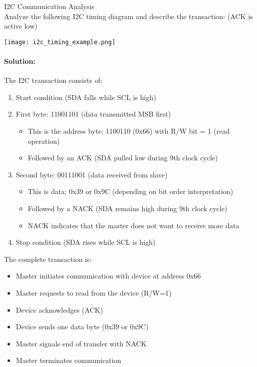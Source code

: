 \begin{example2}{I2C Communication Analysis}\\
Analyze the following I2C timing diagram and describe the transaction: (ACK is active low)

\texttt{[image: i2c\_timing\_example.png]}

\tcblower
\paragraph{Solution:}
The I2C transaction consists of:
\begin{enumerate}
    \item Start condition (SDA falls while SCL is high)
    \item First byte: 11001101 (data transmitted MSB first)
    \begin{itemize}
        \item This is the address byte: 1100110 (0x66) with R/W bit = 1 (read operation)
        \item Followed by an ACK (SDA pulled low during 9th clock cycle)
    \end{itemize}
    \item Second byte: 00111001 (data received from slave)
    \begin{itemize}
        \item This is data: 0x39 or 0x9C (depending on bit order interpretation)
        \item Followed by a NACK (SDA remains high during 9th clock cycle)
        \item NACK indicates that the master does not want to receive more data
    \end{itemize}
    \item Stop condition (SDA rises while SCL is high)
\end{enumerate}

The complete transaction is:
\begin{itemize}
    \item Master initiates communication with device at address 0x66
    \item Master requests to read from the device (R/W=1)
    \item Device acknowledges (ACK)
    \item Device sends one data byte (0x39 or 0x9C)
    \item Master signals end of transfer with NACK
    \item Master terminates communication
\end{itemize}
\end{example2}


